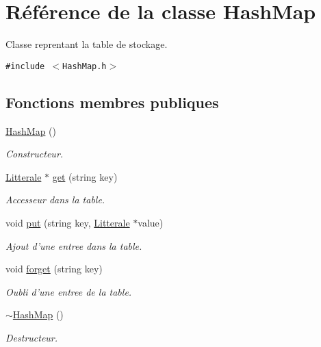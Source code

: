 \hypertarget{class_hash_map}{
\section{Référence de la classe HashMap}
\label{class_hash_map}
}
Classe reprentant la table de stockage.  


{\tt \#include $<$HashMap.h$>$}

\subsection*{Fonctions membres publiques}
\begin{CompactItemize}
\item 
\hypertarget{class_hash_map_3ae91705aa3ebfff22ce92e3c7797050}{
\hyperlink{class_hash_map_3ae91705aa3ebfff22ce92e3c7797050}{HashMap} ()}
\label{class_hash_map_3ae91705aa3ebfff22ce92e3c7797050}

\begin{CompactList}\small\item\em Constructeur. \item\end{CompactList}\item 
\hyperlink{class_litterale}{Litterale} $\ast$ \hyperlink{class_hash_map_28d6dfc1112eb216a754c07255ce0ba3}{get} (string key)
\begin{CompactList}\small\item\em Accesseur dans la table. \item\end{CompactList}\item 
void \hyperlink{class_hash_map_79196be9d74f1da3c2985e19c50e4790}{put} (string key, \hyperlink{class_litterale}{Litterale} $\ast$value)
\begin{CompactList}\small\item\em Ajout d'une entree dans la table. \item\end{CompactList}\item 
void \hyperlink{class_hash_map_32fb1e4adb8f3982861772efa511f7db}{forget} (string key)
\begin{CompactList}\small\item\em Oubli d'une entree de la table. \item\end{CompactList}\item 
\hypertarget{class_hash_map_7120321a936e8018fd276bcd4b4da3b8}{
\hyperlink{class_hash_map_7120321a936e8018fd276bcd4b4da3b8}{$\sim$HashMap} ()}
\label{class_hash_map_7120321a936e8018fd276bcd4b4da3b8}

\begin{CompactList}\small\item\em Destructeur. \item\end{CompactList}\end{CompactItemize}


